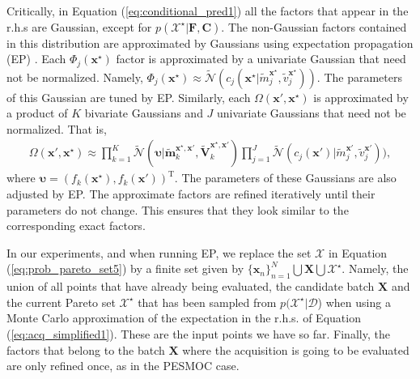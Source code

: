 Critically, in Equation (\ref{eq:conditional_pred1}) all the factors that appear in the r.h.s are Gaussian, 
except for $p(\mathcal{X}^\star|\mathbf{F},\mathbf{C})$. The non-Gaussian factors contained in this
distribution are approximated by Gaussians using expectation propagation (EP) \citep{minka2001expectation}.
Each $\Phi_j(\mathbf{x}^\star)$ factor is approximated by a univariate Gaussian that need not be normalized.
Namely, $\Phi_j(\mathbf{x}^\star)\approx 
\tilde{\mathcal{N}}(c_j(\mathbf{x}^\star|\tilde{m}_j^{\mathbf{x}^\star},\tilde{v}_j^{\mathbf{x}^\star}))$.
The parameters of this Gaussian are tuned by EP. Similarly, each $\Omega(\mathbf{x}',\mathbf{x}^\star)$ is approximated
by a product of $K$ bivariate Gaussians and $J$ univariate Gaussians that need not be normalized. 
That is, 
\begin{align}
\Omega(\mathbf{x}',\mathbf{x}^\star)\approx \prod_{k=1}^K 
\tilde{\mathcal{N}}(\bm{\upsilon}|
\tilde{\mathbf{m}}_k^{\mathbf{x}^\star,\mathbf{x}'}, \tilde{\mathbf{V}}_k^{\mathbf{x}^\star,\mathbf{x}'})
\prod_{j=1}^J \tilde{\mathcal{N}}(c_j(\mathbf{x}')|\tilde{m}_j^{\mathbf{x}'},\tilde{v}_j^{\mathbf{x}'})),
\end{align}
where $\bm{\upsilon}=(f_k(\mathbf{x}^\star),f_k(\mathbf{x}'))^\text{T}$. The parameters of these Gaussians are also
adjusted by EP. The approximate factors are refined iteratively until their
parameters do not change. This ensures that they look similar to 
the corresponding exact factors.

In our experiments, and when running EP, we replace the set $\mathcal{X}$ in Equation (\ref{eq:prob_pareto_set5}) 
by a finite set given by $\{\mathbf{x}_n\}_{n=1}^N \bigcup \mathbf{X} \bigcup \mathcal{X}^\star$. Namely, the union
of all points that have already being evaluated, the candidate batch $\mathbf{X}$ and the current Pareto
set $\mathcal{X}^\star$ that has been sampled from $p(\mathcal{X}^\star|\mathcal{D}$) when using a Monte
Carlo approximation of the expectation in the r.h.s. of Equation (\ref{eq:acq_simplified1}). 
These are the input points we have so far. Finally, the factors that belong to the batch $\mathbf{X}$ where the acquisition
is going to be evaluated are only refined once, as in the PESMOC case.

